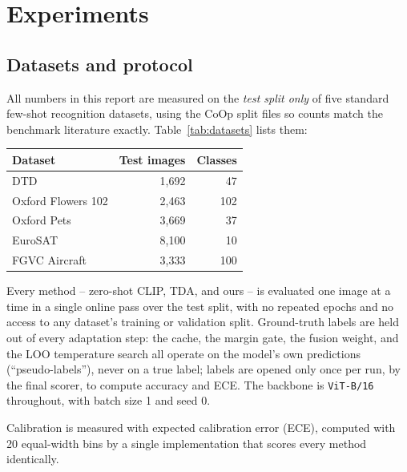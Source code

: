\section{Experiments}
\label{sec:experiments}

\subsection{Datasets and protocol}

All numbers in this report are measured on the \emph{test split only} of five standard
few-shot recognition datasets, using the CoOp split files so counts match the benchmark
literature exactly. Table~\ref{tab:datasets} lists them:

\begin{center}
\begin{tabular}{lrr}
\toprule
Dataset & Test images & Classes \\
\midrule
DTD & 1{,}692 & 47 \\
Oxford Flowers 102 & 2{,}463 & 102 \\
Oxford Pets & 3{,}669 & 37 \\
EuroSAT & 8{,}100 & 10 \\
FGVC Aircraft & 3{,}333 & 100 \\
\bottomrule
\end{tabular}
\label{tab:datasets}
\end{center}

Every method -- zero-shot CLIP, TDA, and ours -- is evaluated one image at a time in a single online pass over the test
split, with no repeated epochs and no access to any dataset's training or validation split.
Ground-truth labels are held out of every adaptation step: the cache, the margin gate, the
fusion weight, and the LOO temperature search all operate on the model's own predictions
(``pseudo-labels''), never on a true label; labels are opened only once per run, by the final
scorer, to compute accuracy and ECE. The backbone is \texttt{ViT-B/16} throughout, with
batch size 1 and seed 0.

Calibration is measured with expected calibration error (ECE), computed with 20 equal-width
bins by a single implementation that scores every method identically.

